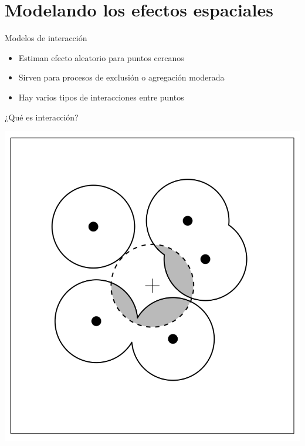 \documentclass[
  11pt,
  ignorenonframetext,
]{beamer}
\providecommand{\tightlist}{%
  \setlength{\itemsep}{0pt}\setlength{\parskip}{0pt}}
\begin{document}
\hypertarget{modelando-los-efectos-espaciales}{%
\section{Modelando los efectos
espaciales}\label{modelando-los-efectos-espaciales}}

\begin{frame}{Modelos de interacción}
\protect\hypertarget{modelos-de-interacciuxf3n}{}
\begin{itemize}
\tightlist
\item
  Estiman efecto aleatorio para puntos cercanos
\item
  Sirven para procesos de exclusión o agregación moderada
\item
  Hay varios tipos de interacciones entre puntos
\end{itemize}
\end{frame}

\begin{frame}{¿Qué es interacción?}
\protect\hypertarget{quuxe9-es-interacciuxf3n}{}
\begin{center}\includegraphics{Figuras/Interaccion-puntos} \end{center}
\end{frame}
\end{document}
